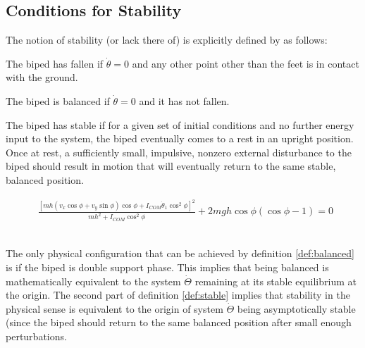 \subsection{Conditions for Stability}
The notion of stability (or lack there of) is explicitly defined by \cite{Wight:2008vt} as follows: 

\hrulefill

\begin{definition} \label{def:fallen}
	The biped has fallen if $\dot{\theta} = 0$ and any other point other than the feet is in contact with the ground. 
\end{definition}

\begin{definition} \label{def:balanced}
	The biped is balanced if $\dot{\theta} = 0$ and it has not fallen. 
\end{definition}

\begin{definition} \label{def:stable}
	The biped has stable if for a given set of initial conditions and no further energy input to the system, the biped eventually comes to a rest in an upright position. Once at rest, a sufficiently small, impulsive, nonzero external disturbance to the biped should result in motion that will eventually return to the same stable, balanced position. 
\end{definition}

\hrulefill

\begin{figure}[!t]
	\begin{equation} \label{eq:fpe}
	\begin{aligned}
		\frac{{{{\left[ {mh({v_x}\cos \phi  + {v_y}\sin \phi )\cos \phi  + {I_{COM}}{{\dot \theta }_1}{{\cos }^2}\phi } \right]}^2}}}{{m{h^2} + {I_{COM}}{{\cos }^2}\phi }} + 2mgh\cos \phi (\cos \phi  - 1) = 0
	\end{aligned}
	\end{equation}
	\\ 
	\hrulefill
\end{figure}

The only physical configuration that can be achieved by definition \ref{def:balanced} is if the biped is double support phase. This implies that being balanced is mathematically equivalent to the system $\dot{\Theta}$ remaining at its stable equilibrium at the origin. The second part of definition \ref{def:stable} implies that stability in the physical sense is equivalent to the origin of system $\dot{\Theta}$ being asymptotically stable (since the biped should return to the same balanced position after small enough perturbations.

